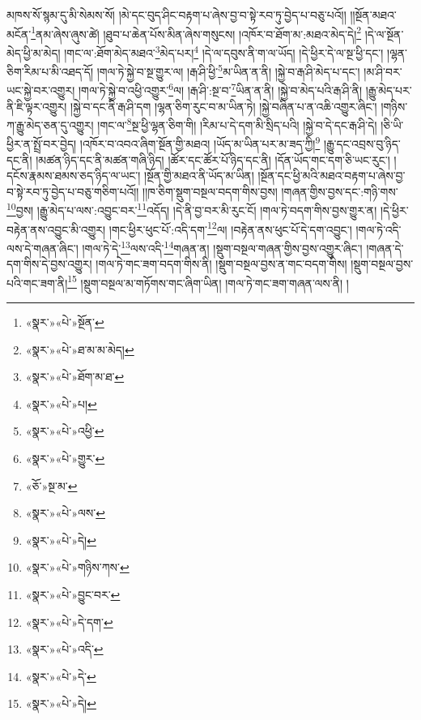 མཁས་སོ་སྙམ་དུ་མི་སེམས་སོ། །མེ་དང་བུད་ཤིང་བརྟག་པ་ཞེས་བྱ་བ་སྟེ་རབ་ཏུ་བྱེད་པ་བཅུ་པའོ།། །།སྔོན་མཐའ་མངོན་\footnote{«སྣར་»«པེ་»སྔོན་}ནམ་ཞེས་ཞུས་ཚེ། །ཐུབ་པ་ཆེན་པོས་མིན་ཞེས་གསུངས། །འཁོར་བ་ཐོག་མ་:མཐའ་མེད་དེ།\footnote{«སྣར་»«པེ་»ཐ་མ་མ་མེད།} །དེ་ལ་སྔོན་མེད་ཕྱི་མ་མེད། །གང་ལ་:ཐོག་མེད་མཐའ་\footnote{«སྣར་»«པེ་»ཐོག་མ་ཐ་}མེད་པར།\footnote{«སྣར་»«པེ་»པ།} །དེ་ལ་དབུས་ནི་ག་ལ་ཡོད། །དེ་ཕྱིར་དེ་ལ་སྔ་ཕྱི་དང་། །ལྷན་ཅིག་རིམ་པ་མི་འཐད་དོ། །གལ་ཏེ་སྐྱེ་བ་སྔ་གྱུར་ལ། །རྒ་ཤི་ཕྱི་\footnote{«སྣར་»«པེ་»འཕྱི་}མ་ཡིན་ན་ནི། །སྐྱེ་བ་རྒ་ཤི་མེད་པ་དང་། །མ་ཤི་བར་ཡང་སྐྱེ་བར་འགྱུར། །གལ་ཏེ་སྐྱེ་བ་འཕྱི་འགྱུར་\footnote{«སྣར་»«པེ་»གྱུར་}ལ། །རྒ་ཤི་:སྔ་བ་\footnote{«ཅོ་»སྔ་མ་}ཡིན་ན་ནི། །སྐྱེ་བ་མེད་པའི་རྒ་ཤི་ནི། །རྒྱུ་མེད་པར་ནི་ཇི་ལྟར་འགྱུར། །སྐྱེ་བ་དང་ནི་རྒ་ཤི་དག །ལྷན་ཅིག་རུང་བ་མ་ཡིན་ཏེ། །སྐྱེ་བཞིན་པ་ན་འཆི་འགྱུར་ཞིང་། །གཉིས་ཀ་རྒྱུ་མེད་ཅན་དུ་འགྱུར། །གང་ལ་\footnote{«སྣར་»«པེ་»ལས་}སྔ་ཕྱི་ལྷན་ཅིག་གི། །རིམ་པ་དེ་དག་མི་སྲིད་པའི། །སྐྱེ་བ་དེ་དང་རྒ་ཤི་དེ། །ཅི་ཡི་ཕྱིར་ན་སྤྲོ་བར་བྱེད། །འཁོར་བ་འབའ་ཞིག་སྔོན་གྱི་མཐའ། །ཡོད་མ་ཡིན་པར་མ་ཟད་ཀྱི།\footnote{«སྣར་»«པེ་»དེ།} །རྒྱུ་དང་འབྲས་བུ་ཉིད་དང་ནི། །མཚན་ཉིད་དང་ནི་མཚན་གཞི་ཉིད། །ཚོར་དང་ཚོར་པོ་ཉིད་དང་ནི། །དོན་ཡོད་གང་དག་ཅི་ཡང་རུང་། །དངོས་རྣམས་ཐམས་ཅད་ཉིད་ལ་ཡང་། །སྔོན་གྱི་མཐའ་ནི་ཡོད་མ་ཡིན། །སྔོན་དང་ཕྱི་མའི་མཐའ་བརྟག་པ་ཞེས་བྱ་བ་སྟེ་རབ་ཏུ་བྱེད་པ་བཅུ་གཅིག་པའོ།། །།ཁ་ཅིག་སྡུག་བསྔལ་བདག་གིས་བྱས། །གཞན་གྱིས་བྱས་དང་:གཉི་གས་\footnote{«སྣར་»«པེ་»གཉིས་ཀས་}བྱས། །རྒྱུ་མེད་པ་ལས་:འབྱུང་བར་\footnote{«སྣར་»«པེ་»བྱུང་བར་}འདོད། །དེ་ནི་བྱ་བར་མི་རུང་ངོ། །གལ་ཏེ་བདག་གིས་བྱས་གྱུར་ན། །དེ་ཕྱིར་བརྟེན་ནས་འབྱུང་མི་འགྱུར། །གང་ཕྱིར་ཕུང་པོ་:འདི་དག་\footnote{«སྣར་»«པེ་»དེ་དག་}ལ། །བརྟེན་ནས་ཕུང་པོ་དེ་དག་འབྱུང་། །གལ་ཏེ་འདི་ལས་དེ་གཞན་ཞིང་། །གལ་ཏེ་དེ་\footnote{«སྣར་»«པེ་»འདི་}ལས་འདི་\footnote{«སྣར་»«པེ་»དེ་}གཞན་ན། །སྡུག་བསྔལ་གཞན་གྱིས་བྱས་འགྱུར་ཞིང་། །གཞན་དེ་དག་གིས་དེ་བྱས་འགྱུར། །གལ་ཏེ་གང་ཟག་བདག་གིས་ནི། །སྡུག་བསྔལ་བྱས་ན་གང་བདག་གིས། །སྡུག་བསྔལ་བྱས་པའི་གང་ཟག་ནི།\footnote{«སྣར་»«པེ་»དེ།} །སྡུག་བསྔལ་མ་གཏོགས་གང་ཞིག་ཡིན། །གལ་ཏེ་གང་ཟག་གཞན་ལས་ནི། །
